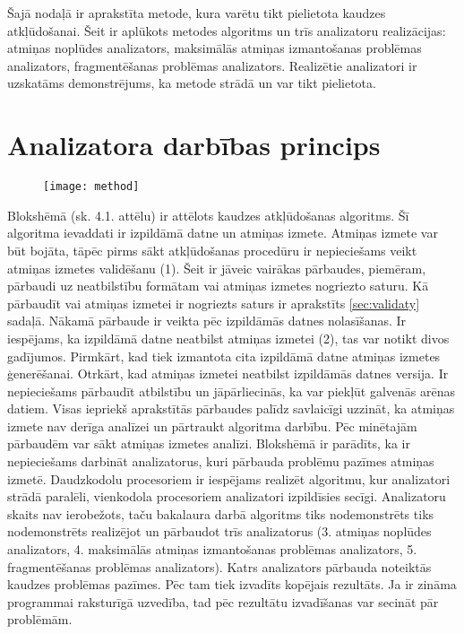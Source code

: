 ﻿Šajā nodaļā ir aprakstīta metode, kura varētu tikt pielietota kaudzes atkļūdošanai. 
Šeit ir aplūkots metodes algoritms un trīs analizatoru realizācijas: atmiņas noplūdes analizators, maksimālās atmiņas izmantošanas problēmas analizators, fragmentēšanas problēmas analizators.
Realizētie analizatori ir uzskatāms demonstrējums, ka metode strādā un var tikt pielietota.
\section{Analizatora darbības princips}

 \begin{figure}[h]
\begin{center}
\texttt{[image: method]}
\end{center}
\caption{\textbf{\fontsize{11}{12}\selectfont {Uz metodi balstītā algoritma blokshēma}}}
\end{figure}

Blokshēmā (sk. 4.1. attēlu) ir attēlots kaudzes atkļūdošanas algoritms.
Šī algoritma ievaddati ir izpildāmā datne un atmiņas izmete.
Atmiņas izmete var būt bojāta, tāpēc pirms sākt atkļūdošanas procedūru ir nepieciešams veikt atmiņas izmetes validēšanu (1).
Šeit ir jāveic vairākas pārbaudes, piemēram, pārbaudi uz neatbilstību formātam vai atmiņas izmetes nogriezto saturu.
Kā pārbaudīt vai atmiņas izmetei ir nogriezts saturs ir aprakstīts \ref{sec:validaty} sadaļā.
Nākamā pārbaude ir veikta pēc izpildāmās datnes nolasīšanas.
Ir iespējams, ka izpildāmā datne neatbilst atmiņas izmetei (2), tas var notikt divos gadījumos.
Pirmkārt, kad tiek izmantota cita izpildāmā datne atmiņas izmetes ģenerēšanai.
Otrkārt, kad atmiņas izmetei neatbilst izpildāmās datnes versija.
Ir nepieciešams pārbaudīt atbilstību un jāpārliecinās, ka var piekļūt galvenās arēnas datiem.
Visas iepriekš aprakstītās pārbaudes palīdz savlaicīgi uzzināt, ka atmiņas izmete nav derīga analīzei un pārtraukt algoritma darbību.
Pēc minētajām pārbaudēm var sākt atmiņas izmetes analīzi.
Blokshēmā ir parādīts, ka ir nepieciešams darbināt analizatorus, kuri  pārbauda problēmu pazīmes atmiņas izmetē.
Daudzkodolu procesoriem ir iespējams realizēt algoritmu, kur analizatori strādā paralēli, vienkodola procesoriem analizatori izpildīsies secīgi.
Analizatoru skaits nav ierobežots, taču bakalaura darbā algoritms tiks nodemonstrēts tiks nodemonstrēts realizējot un pārbaudot trīs analizatorus (3. atmiņas noplūdes analizators, 4. maksimālās atmiņas izmantošanas problēmas analizators, 5. fragmentēšanas problēmas analizators).
Katrs analizators pārbauda noteiktās kaudzes problēmas pazīmes.
Pēc tam tiek izvadīts kopējais rezultāts.
Ja ir zināma programmai raksturīgā uzvedība, tad pēc rezultātu izvadīšanas var secināt pār problēmām.

